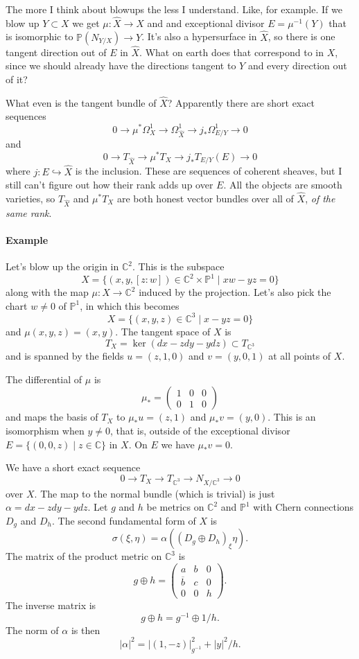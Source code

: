 \documentclass[11pt]{article}
\theoremstyle{definition}
\newcommand{\kk}[1]{\mathbb{#1}}
\def\ov#1{\overline{#1}}
\begin{document}
The more I think about blowups the less I understand.
Like, for example. If we blow up $Y \subset X$ we get $\mu : \widehat X \to X$
and and exceptional divisor $E = \mu^{-1}(Y)$ that is isomorphic to $\kk
P(N_{Y/X}) \to Y$.
It's also a hypersurface in $\widehat X$, so there is one tangent direction out
of $E$ in $\widehat X$.
What on earth does that correspond to in $X$, since we should already have the
directions tangent to $Y$ and every direction out of it?

What even is the tangent bundle of $\widehat X$?
Apparently there are short exact sequences
$$
0 \to \mu^*\Omega^1_X \to \Omega^1_{\widehat X} \to j_* \Omega^1_{E/Y} \to 0
$$
and
$$
0 \to T_{\widehat X} \to \mu^* T_X \to j_*T_{E/Y}(E) \to 0
$$
where $j : E \hookrightarrow \widehat X$ is the inclusion.
These are sequences of coherent sheaves, but I still can't figure out how their
rank adds up over $E$.
All the objects are smooth varieties, so $T_{\widehat X}$ and $\mu^* T_X$ are
both honest vector bundles over all of $\widehat X$, \emph{of the same rank}.


\paragraph{Example}

Let's blow up the origin in $\kk C^2$.
This is the subspace
$$
X = \{(x,y,[z:w]) \in \kk C^2 \times \kk P^1 \mid xw - yz = 0 \}
$$
along with the map $\mu : X \to \kk C^2$ induced by the projection.
Let's also pick the chart $w \not= 0$ of $\kk P^1$, in which this becomes
$$
X = \{(x,y,z) \in \kk C^3 \mid x - yz = 0 \}
$$
and $\mu(x,y,z) = (x,y)$.
The tangent space of $X$ is
$$
T_X = \ker (dx - z dy - y dz) \subset T_{\kk C^3}
$$
and is spanned by the fields $u = (z,1,0)$ and $v = (y,0,1)$ at all points of $X$.

The differential of $\mu$ is
$$
\mu_* = \begin{pmatrix}
1 & 0 & 0
\\
0 & 1 & 0
\end{pmatrix}
$$
and maps the basis of $T_X$ to $\mu_* u = (z,1)$ and $\mu_* v = (y,0)$.
This is an isomorphism when $y \not= 0$, that is, outside of the exceptional
divisor $E = \{(0,0,z) \mid z \in \kk C \}$ in $X$.
On $E$ we have $\mu_* v = 0$.

We have a short exact sequence
$$
0 \to T_X \to T_{\kk C^3} \to N_{X/\kk C^3} \to 0
$$
over $X$.
The map to the normal bundle (which is trivial) is just $\alpha = dx - zdy - ydz$.
Let $g$ and $h$ be metrics on $\kk C^2$ and $\kk P^1$ with Chern connections
$D_g$ and $D_h$.
The second fundamental form of $X$ is
$$
\sigma(\xi, \eta)
= \alpha((D_g \oplus D_h)_\xi \eta).
$$
The matrix of the product metric on $\kk C^3$ is
$$
g \oplus h
= \begin{pmatrix}
a & b & 0
\\
\ov b & c & 0
\\
0 & 0 & h
\end{pmatrix}.
$$
The inverse matrix is
$$
g \oplus h
= g^{-1} \oplus 1/h.
$$
The norm of $\alpha$ is then
$$
|\alpha|^2
= |(1,-z)|^2_{g^{-1}} + |y|^2/h.
$$
\end{document}
